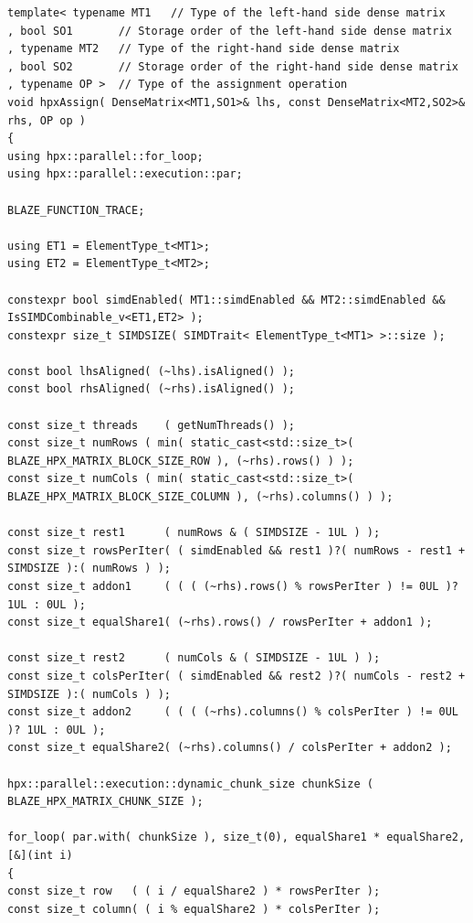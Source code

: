 \begin{lstlisting}[basicstyle=\fontsize{8}{9}\selectfont,float,floatplacement=H,caption= {New implementation of Assign function for HPX backend in Blaze.}, label={new_hpx_backend}]
template< typename MT1   // Type of the left-hand side dense matrix
, bool SO1       // Storage order of the left-hand side dense matrix
, typename MT2   // Type of the right-hand side dense matrix
, bool SO2       // Storage order of the right-hand side dense matrix
, typename OP >  // Type of the assignment operation
void hpxAssign( DenseMatrix<MT1,SO1>& lhs, const DenseMatrix<MT2,SO2>& rhs, OP op )
{
using hpx::parallel::for_loop;
using hpx::parallel::execution::par;

BLAZE_FUNCTION_TRACE;

using ET1 = ElementType_t<MT1>;
using ET2 = ElementType_t<MT2>;

constexpr bool simdEnabled( MT1::simdEnabled && MT2::simdEnabled && IsSIMDCombinable_v<ET1,ET2> );
constexpr size_t SIMDSIZE( SIMDTrait< ElementType_t<MT1> >::size );

const bool lhsAligned( (~lhs).isAligned() );
const bool rhsAligned( (~rhs).isAligned() );

const size_t threads    ( getNumThreads() );
const size_t numRows ( min( static_cast<std::size_t>( BLAZE_HPX_MATRIX_BLOCK_SIZE_ROW ), (~rhs).rows() ) );
const size_t numCols ( min( static_cast<std::size_t>( BLAZE_HPX_MATRIX_BLOCK_SIZE_COLUMN ), (~rhs).columns() ) );

const size_t rest1      ( numRows & ( SIMDSIZE - 1UL ) );
const size_t rowsPerIter( ( simdEnabled && rest1 )?( numRows - rest1 + SIMDSIZE ):( numRows ) );
const size_t addon1     ( ( ( (~rhs).rows() % rowsPerIter ) != 0UL )? 1UL : 0UL );
const size_t equalShare1( (~rhs).rows() / rowsPerIter + addon1 );

const size_t rest2      ( numCols & ( SIMDSIZE - 1UL ) );
const size_t colsPerIter( ( simdEnabled && rest2 )?( numCols - rest2 + SIMDSIZE ):( numCols ) );
const size_t addon2     ( ( ( (~rhs).columns() % colsPerIter ) != 0UL )? 1UL : 0UL );
const size_t equalShare2( (~rhs).columns() / colsPerIter + addon2 );

hpx::parallel::execution::dynamic_chunk_size chunkSize ( BLAZE_HPX_MATRIX_CHUNK_SIZE );

for_loop( par.with( chunkSize ), size_t(0), equalShare1 * equalShare2, [&](int i)
{
const size_t row   ( ( i / equalShare2 ) * rowsPerIter );
const size_t column( ( i % equalShare2 ) * colsPerIter );


\end{lstlisting}
